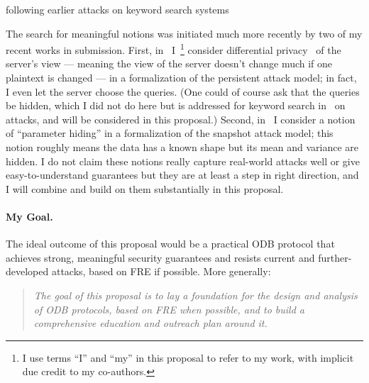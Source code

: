 following earlier attacks on keyword search systems~\cite{hore12, arasu13, islam14, cash15}

The search for meaningful notions was initiated much more recently by two of my recent works in submission. First, in~\cite{KKNO17} I~\footnote{I use terms ``I'' and ``my'' in this proposal to refer to my  work, with implicit due credit to my co-authors.} consider
differential privacy~\cite{DMNS06,DKMMN06} of the server's view --- meaning the view of the server doesn't change much if one plaintext is changed --- in a  formalization of the persistent attack model; in fact, I even let the server choose the queries. (One could of course ask that the queries be hidden, which I did not do here but is addressed for keyword search in~\cite{HO18} on attacks, and will be considered in this proposal.)  Second, in~\cite{CLOZZ18} I consider a notion of ``parameter hiding'' in a formalization of the snapshot attack model; this notion roughly means the data has a known shape but its mean and variance are hidden. I do not claim these notions really capture real-world attacks well or give easy-to-understand guarantees but they are at least a step in right direction, and I will combine and build on them substantially in this proposal.


\paragraph*{My Goal.} The ideal outcome of this proposal would be a practical ODB protocol that achieves strong, meaningful security guarantees and resists current and further-developed attacks, based on FRE if possible.  More generally:

 \begin{quote} \emph{The goal of this proposal is to lay a foundation for the design and analysis of ODB protocols, based on FRE when possible, and to build a comprehensive education and outreach plan around it.}
\end{quote}



